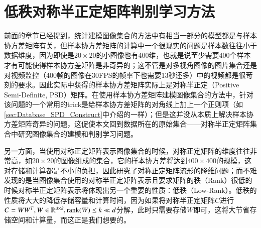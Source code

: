 \chapter{低秩对称半正定矩阵判别学习方法}
\label{chap:PSD_discrim_learning}
前面的章节已经提到，统计建模图像集合的方法中有相当一部分的模型都是与样本协方差矩阵有关，但样本协方差矩阵的计算中一个很现实的问题是样本数往往小于数据维度，因为即使是$20\times 20$的小图像也有400维，也就是说至少需要400个样本才有可能使得样本协方差矩阵是非奇异的；这不管是对多视角图像的图片集合还是对视频监控（400帧的图像在30FPS的帧率下也需要13秒还多）中的视频都是很苛刻的要求。因此实际中获得的样本协方差矩阵实际上是对称半正定（Positive Semi-Definite, PSD）矩阵。在使用样本协方差矩阵建模图像集合的方法中，针对该问题的一个常用的trick是给样本协方差矩阵的对角线上加上一个正则项（如\ref{sec:Database_SPD_Construct}中介绍的一样）；但是这并没从本质上解决样本协方差矩阵奇异的问题，这促使本文回到数据所在的原始集合——对称半正定矩阵集合中研究图像集合的建模和判别学习问题。

另一方面，当使用对称正定矩阵表示图像集合的时候，对称正定矩阵的维度往往非常高，如$20 \times 20$的图像组成的集合，它的样本协方差将达到$400\times 400$的规模，这对存储和计算都是不小的负担，因此\cite{Statistics_SPDML,Statistics_LEML}研究了对称正定矩阵流形的降维问题；而不难发现的是当图像集合使用的对称半正定矩阵表示且要求矩阵的秩（Rank）很低的时候对称半正定矩阵表示将体现出另一个重要的性质：低秩（Low-Rank）。低秩的性质将大大的降低存储容量和计算时间，因为如果将对称半正定矩阵$C$进行$C=WW^{T},W \in \mathbb{R}^{d\times k},{\rm rank}(W)\leq k \ll d$分解，此时只需要存储$W$即可，这将大节省存储空间和计算量，而这正是我们想要的。

